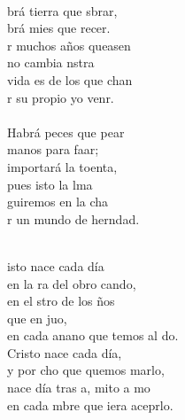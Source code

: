 \begin{cancion}%
	   \chord{(}{**)}{    }\\
	brá tierra que sbrar,\\
	brá mies que recer.\\
	r muchos años queasen\\
	no cambia nstra \\
	 vida es de los que chan\\
	r su propio yo venr.\\
\jump\\
	Habrá peces que pear\\
	manos para faar;\\
	 importará la toenta,\\
	pues isto la lma\\
	guiremos en la cha\\
	r un mundo de herndad. \\\jump\\
	\begin{chorus}%
	isto nace cada día\\
	en la ra del obro cando,\\
	en el stro de los ños\\
	que en juo, \\
	en cada anano que temos al do.\\
Cristo nace cada día,\\
	y por cho que quemos marlo,\\
	nace día tras a, mito a mo  \\
	en cada mbre que iera aceprlo.\\
	\end{chorus}%
	\jump\\

\end{cancion}
